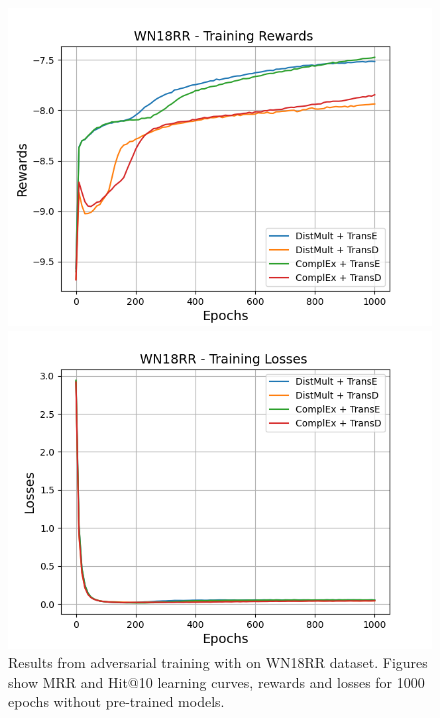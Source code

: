 \begin{figure}[H]
    \begin{minipage}{.45\textwidth}
      \centering
      \includegraphics[width=0.9\linewidth]{figures/results/gan_train/not_pretrained/random/wn18rr/epochs1000/random_wn18rr_rew.png}
    \end{minipage}%
     \begin{minipage}{.45\textwidth}
      \centering
      \includegraphics[width=0.9\linewidth]{figures/results/gan_train/not_pretrained/random/wn18rr/epochs1000/random_wn18rr_losses.png}
    \end{minipage}%
    \caption{Results from adversarial training with \origsampling on \textsc{WN18RR} dataset.
    Figures show MRR and Hit@10 learning curves, rewards and losses for 1000 epochs without pre-trained models.}
    \label{fig:gan_train_not_pretrained_random_wn18rr}
\end{figure}
